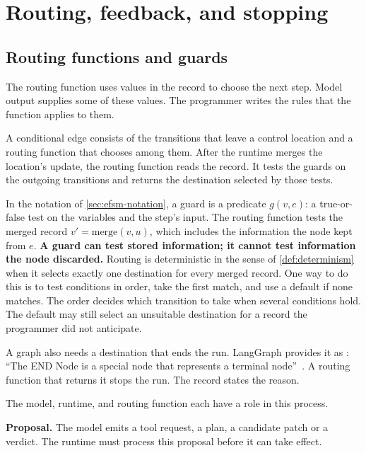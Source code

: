 \section{Routing, feedback, and stopping}
\label{sec:control}

\subsection{Routing functions and guards}
\label{sec:control-routing}

The routing function uses values in the record to choose the next step. Model output supplies
some of these values. The programmer writes the rules that the function applies to them.

\begin{definition}
\label{def:conditional-edge}
A conditional edge consists of the transitions that leave a control location and a routing
function that chooses among them. After the runtime merges the location's update, the routing
function reads the record. It tests the guards on the outgoing transitions and returns the
destination selected by those tests.
\end{definition}

In the notation of \cref{sec:efsm-notation}, a guard is a predicate $g(v, e)$: a true-or-false test
on the variables and the step's input. The routing function tests the merged record
$v' = \mathrm{merge}(v, u)$, which includes the information the node kept from $e$.
\textbf{A guard can test stored information; it cannot test information the node discarded.}
Routing is deterministic in the sense of \cref{def:determinism} when it selects exactly one
destination for every merged record. One way to do this is to test conditions in order, take the
first match, and use a default if none matches. The order decides which transition to take when
several conditions hold. The default may still select an unsuitable destination for a record the
programmer did not anticipate.

A graph also needs a destination that ends the run. LangGraph provides it as : ``The
END Node is a special node that represents a terminal node''~\citep{langgraph-graph-api}. A routing
function that returns it stops the run. The record states the reason.

The model, runtime, and routing function each have a role in this process.

\bi

\item \textbf{Proposal.} The model emits a tool request, a plan, a candidate patch or a verdict.
The runtime must process this proposal before it can take effect.

